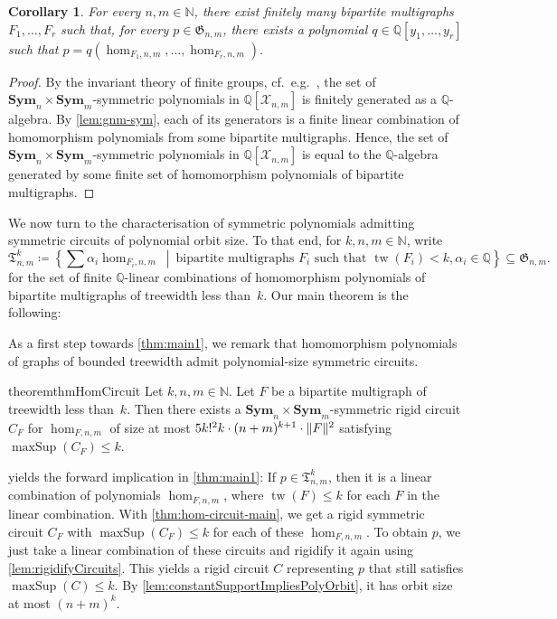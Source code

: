 \documentclass[10pt,a4paper]{article}
\theoremstyle{definition}
\theoremstyle{plain}
\newtheorem{corollary}[definition]{Corollary}
\theoremstyle{remark}
\DeclarePairedDelimiter{\norm}{\lVert}{\rVert}
\DeclareMathOperator{\tw}{tw}
\newcommand{\Sym}{\mathbf{Sym}}
\DeclareMathOperator{\maxSup}{maxSup}
\begin{document}
	\begin{corollary}
		For every $n,m \in \mathbb{N}$,
		there exist finitely many bipartite multigraphs $F_1, \dots, F_r$ such that, for every $p \in \mathfrak{G}_{n,m}$,
		there exists a polynomial $q \in \mathbb{Q}[y_1, \dots, y_r]$ such that 
		\(
		p = q(\hom_{F_1, n,m}, \dots, \hom_{F_r, n,m}).
		\)
	\end{corollary}
	\begin{proof}
		By the invariant theory of finite groups, cf.\ e.g.\ \cite[Proposition~3.0.1]{derksen_computational_2015}, 
		the set of $\Sym_n \times \Sym_m$-symmetric polynomials in $\mathbb{Q}[\mathcal{X}_{n,m}]$ is finitely generated as a $\mathbb{Q}$-algebra.
		By \cref{lem:gnm-sym}, each of its generators is a finite linear combination of homomorphism polynomials from some bipartite multigraphs.
		Hence, the set of $\Sym_n \times \Sym_m$-symmetric polynomials in $\mathbb{Q}[\mathcal{X}_{n,m}]$ is equal to the $\mathbb{Q}$-algebra generated by some finite set of homomorphism polynomials of bipartite multigraphs.
	\end{proof}
	
	We now turn to the characterisation of symmetric polynomials admitting symmetric circuits of polynomial orbit size.
	To that end, for $k,n,m \in \mathbb{N}$, write
	\[
		\mathfrak{T}_{n,m}^k \coloneqq \left\{\sum \alpha_i \hom_{F_i, n,m} \ \middle|\  \text{bipartite multigraphs } F_i \text{ such that } \tw(F_i) < k, \alpha_i \in \mathbb{Q} \right\} \subseteq \mathfrak{G}_{n,m}.
	\]
	for the set of finite $\mathbb{Q}$-linear combinations of homomorphism polynomials of bipartite multigraphs of treewidth less than~$k$.
	Our main theorem is the following:

	\thmMain*
	
	As a first step towards \cref{thm:main1}, we remark that homomorphism polynomials of graphs of bounded treewidth admit polynomial-size symmetric circuits. 
	
	\begin{restatable}{theorem}{thmHomCircuit}\label{thm:hom-circuit-main}
		Let $k, n, m \in \mathbb{N}$.
		Let $F$ be a bipartite multigraph of treewidth less than~$k$.
		Then there exists a $\Sym_n \times \Sym_{m}$-symmetric rigid circuit $C_F$ for $\hom_{F,n,m}$ of size at most $5k!^2k \cdot (n+m)^{k+1} \cdot \norm{F}^2$ satisfying $\maxSup(C_F) \leq k$.
	\end{restatable}
	
	 yields the forward implication in \cref{thm:main1}: If $p \in \mathfrak{T}_{n,m}^k$, then it is a linear combination of polynomials $\hom_{F,n,m}$, where $\tw(F) \leq k$ for each $F$ in the linear combination. With \cref{thm:hom-circuit-main}, we get a rigid symmetric circuit $C_F$ with $\maxSup(C_F) \leq k$ for each of these $\hom_{F,n,m}$. To obtain $p$, we just take a linear combination of these circuits and rigidify it again using \cref{lem:rigidifyCircuits}. This yields a rigid circuit $C$ representing $p$ that still satisfies $\maxSup(C) \leq k$. By \cref{lem:constantSupportImpliesPolyOrbit}, it has orbit size at most $(n+m)^k$.  
	
\end{document}
